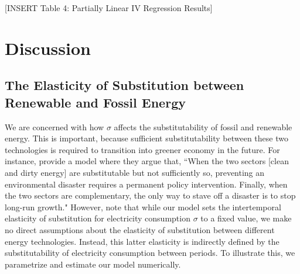\documentclass[11pt,a4paper,leqno]{extarticle}
\begin{document}
	
	\vspace{0.15in}
	\begin{center}
		[INSERT Table 4: Partially Linear IV Regression Results]
	\end{center}
	\vspace{0.15in}
	
	
	
	
	\clearpage
	\section{Discussion}
	\label{sec:Discussion}
	
	\subsection{The Elasticity of Substitution between Renewable and Fossil Energy}
	
	
	We are concerned with how $\sigma$ affects the substitutability of fossil and renewable energy. This is important, because sufficient substitutability between these two technologies is required to transition into greener economy in the future. For instance, \citet{Ace2012} provide a model where they argue that, ``When the two
	sectors [clean and dirty energy] are substitutable but not sufficiently so, preventing an environmental disaster requires a permanent policy intervention. Finally, when the two sectors are complementary, the only way to stave off a disaster is to stop long-run growth." However, note that while our model sets the intertemporal elasticity of substitution for  electricity consumption $\sigma$ to a fixed value, we make no direct assumptions about the elasticity of substitution between different energy technologies. Instead, this latter elasticity is indirectly defined by the substitutability of electricity consumption between periods. To illustrate this, we parametrize and estimate our model numerically.
	
\end{document}

